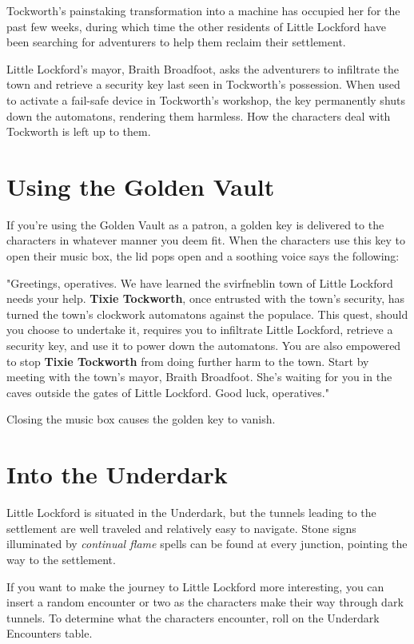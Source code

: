 \documentclass[10pt,a4paper,twoside,bg=print,twocolumn,openany,nodeprecatedcode]{dndbook}
\begin{document}
Tockworth's painstaking transformation into a machine has occupied her for the past few weeks, during which time the other residents of Little Lockford have been searching for adventurers to help them reclaim their settlement.

Little Lockford's mayor, Braith Broadfoot, asks the adventurers to infiltrate the town and retrieve a security key last seen in Tockworth's possession. When used to activate a fail-safe device in Tockworth's workshop, the key permanently shuts down the automatons, rendering them harmless. How the characters deal with Tockworth is left up to them.

\section{Using the Golden Vault}
If you're using the Golden Vault as a patron, a golden key is delivered to the characters in whatever manner you deem fit. When the characters use this key to open their music box, the lid pops open and a soothing voice says the following:

\begin{DndReadAloud}{}
"Greetings, operatives. We have learned the svirfneblin town of Little Lockford needs your help. \textbf{Tixie Tockworth}, once entrusted with the town's security, has turned the town's clockwork automatons against the populace. This quest, should you choose to undertake it, requires you to infiltrate Little Lockford, retrieve a security key, and use it to power down the automatons. You are also empowered to stop \textbf{Tixie Tockworth} from doing further harm to the town. Start by meeting with the town's mayor, Braith Broadfoot. She's waiting for you in the caves outside the gates of Little Lockford. Good luck, operatives."

\end{DndReadAloud}

Closing the music box causes the golden key to vanish.

\section{Into the Underdark}
Little Lockford is situated in the Underdark, but the tunnels leading to the settlement are well traveled and relatively easy to navigate. Stone signs illuminated by \textit{continual flame} spells can be found at every junction, pointing the way to the settlement.

If you want to make the journey to Little Lockford more interesting, you can insert a random encounter or two as the characters make their way through dark tunnels. To determine what the characters encounter, roll on the Underdark Encounters table.
\end{document}
